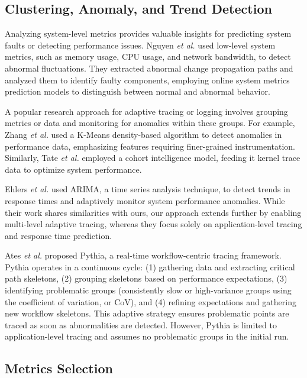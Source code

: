 \documentclass[pdflatex,sn-nature]{sn-jnl}%
\theoremstyle{thmstyleone}%
\theoremstyle{thmstyletwo}%
\theoremstyle{thmstylethree}%
\begin{document}
\subsection{Clustering, Anomaly, and Trend Detection}

Analyzing system-level metrics provides valuable insights for predicting system faults or detecting performance issues. Nguyen \textit{et al.} \cite{nguyen2013fchain} used low-level system metrics, such as memory usage, CPU usage, and network bandwidth, to detect abnormal fluctuations. They extracted abnormal change propagation paths and analyzed them to identify faulty components, employing online system metrics prediction models to distinguish between normal and abnormal behavior.

A popular research approach for adaptive tracing or logging involves grouping metrics or data and monitoring for anomalies within these groups. For example, Zhang \textit{et al.} \cite{zhang2020diagnostic} used a K-Means density-based algorithm to detect anomalies in performance data, emphasizing features requiring finer-grained instrumentation. Similarly, Tate \textit{et al.} \cite{tate2017optimization} employed a cohort intelligence model, feeding it kernel trace data to optimize system performance.

Ehlers \textit{et al.} \cite{ehlers2011self} used ARIMA, a time series analysis technique, to detect trends in response times and adaptively monitor system performance anomalies. While their work shares similarities with ours, our approach extends further by enabling multi-level adaptive tracing, whereas they focus solely on application-level tracing and response time prediction.

Ates \textit{et al.} \cite{ates2019automated} proposed Pythia, a real-time workflow-centric tracing framework. Pythia operates in a continuous cycle: (1) gathering data and extracting critical path skeletons, (2) grouping skeletons based on performance expectations, (3) identifying problematic groups (consistently slow or high-variance groups using the coefficient of variation, or CoV), and (4) refining expectations and gathering new workflow skeletons. This adaptive strategy ensures problematic points are traced as soon as abnormalities are detected. However, Pythia is limited to application-level tracing and assumes no problematic groups in the initial run.


\subsection{Metrics Selection}
\end{document}
